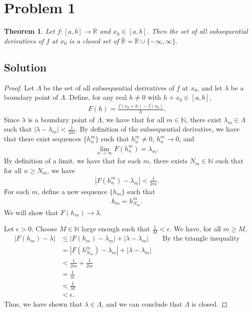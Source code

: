 \documentclass[10pt,a4paper]{article}
\author{Jeremiah Givens}
\theoremstyle{theorem}
\newtheorem{theorem}{Theorem}
\theoremstyle{definition}
\begin{document}
\section*{Problem 1}
\begin{theorem}
Let $f:[a,b] \to \mathbb{R}$ and $x_0 \in [a, b]$. Then the set of all subsequential derivatives of $f$ at $x_0$ is a closed set of $\bar{\mathbb{R}} = \mathbb{R} \cup \{-\infty, \infty \}$.
\end{theorem}

\subsection*{Solution}
\begin{proof}
Let $\Lambda$ be the set of all subsequential derivatives of $f$ at $x_0$, and let $\lambda$ be a boundary point of $\Lambda$. Define, for any real $h \not = 0$ with $h + x_0 \in [a, b]$,
\begin{align*}
F(h) = \frac{f(x_0 + h) - f(x_0)}{h}.
\end{align*}
Since $\lambda$ is a boundary point of $\Lambda$, we have that for all $m \in \mathbb{N}$, there exist $\lambda_m \in \Lambda$ such that $|\lambda - \lambda_m| < \frac{1}{2m}$. By definition of the subsequential derivative, we have that there exist sequences $\{h_n^m \}$ such that $h_n^m \not = 0$, $h_n^m \to 0$, and 
\begin{align*}
\lim_{n \to \infty} F(h_n^m) = \lambda_m.
\end{align*}
By definition of a limit, we have that for each $m$, there exists $N_m \in \mathbb{N}$ such that for all $n \geq N_m$, we have
\begin{align*}
|F(h_n^m) - \lambda_m| < \frac{1}{2m}.
\end{align*}
For each $m$, define a new sequence $\{h_m \}$ such that 
\begin{align*}
h_m = h_{N_m}^m.
\end{align*}
We will show that $F(h_m) \to \lambda$.

Let $\epsilon > 0$. Choose $M \in \mathbb{N}$ large enough such that $\frac{1}{M} < \epsilon$. We have, for all $m \geq M$,
\begin{align*}
|F(h_m) - \lambda| &\leq |F(h_m) - \lambda_m| + |\lambda - \lambda_m| &&\text{By the triangle inequality}\\
&= |F(h_{N_m}^m) - \lambda_m| + |\lambda - \lambda_m|\\
&< \frac{1}{2m} + \frac{1}{2m}\\
&= \frac{1}{m}\\
&< \frac{1}{M}\\
&< \epsilon.
\end{align*}
Thus, we have shown that $\lambda \in \Lambda$, and we can conclude that $\Lambda$ is closed.
\end{proof}
\end{document}
